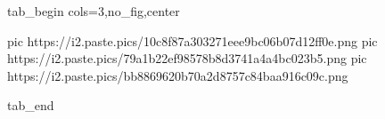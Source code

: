  
 
 
 
 


\ifcmt
  tab_begin cols=3,no_fig,center

     pic https://i2.paste.pics/10c8f87a303271eee9bc06b07d12ff0e.png
		 pic https://i2.paste.pics/79a1b22ef98578b8d3741a4a4bc023b5.png
		 pic https://i2.paste.pics/bb8869620b70a2d8757c84baa916c09c.png

  tab_end
\fi
